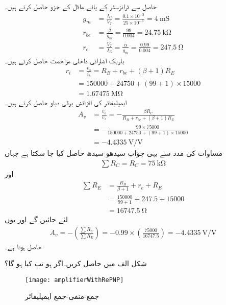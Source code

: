 حاصل   سے ٹرانزسٹر کے پائے ماڈل کے جزو حاصل کرتے ہیں۔
\begin{align*}
g_m&=\frac{I_C}{V_T}=\frac{0.1 \times 10^{-3}}{25 \times 10^{-3}}=\SI{4}{\milli \siemens}\\
r_{be}&=\frac{\beta}{g_m}=\frac{99}{0.004}=\SI{24.75}{\kilo \ohm}\\
r_e&=\frac{V_T}{I_E}=\frac{\alpha}{g_m}=\frac{0.99}{0.004}=\SI{247.5}{\ohm}
\end{align*}
باریک اشاراتی داخلی مزاحمت حاصل کرتے ہیں۔
\begin{align*}
r_i&=\frac{v_s}{i_b}=R_B+r_{be}+\left(\beta+1 \right )R_E\\
&=150000+24750+(99+1) \times 15000\\
&=\SI{1.67475}{\mega \ohm}
\end{align*}
ایمپلیفائر کی افزائش برقی دباو حاصل کرتے ہیں۔
\begin{align*}
A_v&=\frac{v_o}{v_s}=-\frac{\beta R_C}{R_B + r_{be}+(\beta+1)R_E}\\
&=-\frac{99 \times 75000}{150000+24750+(99+1) \times 15000}\\
&=\SI[per=frac,fraction=nice]{-4.4335}{\volt \per \volt}
\end{align*}
مساوات   کی مدد سے یہی جواب سیدھو سیدھ حاصل کیا جا سکتا ہے  جہاں
\begin{align*}
\sum{ R_C}=R_C=\SI{75}{\kilo \ohm}
\end{align*}
اور
\begin{align*}
\sum{R_E}&=\frac{R_B}{\beta+1}+r_e+R_E\\
&=\frac{150000}{99+1}+247.5+15000\\
&=\SI{16747.5}{\ohm}
\end{align*}
لئے جائیں گے اور یوں
\begin{align*}
A_v=-\left(\frac{\sum {R_C}}{\sum {R_E}} \right )=-0.99 \times \left(\frac{75000}{16747.5} \right )=\SI[per=frac,fraction=nice]{-4.4335}{\volt \per \volt}
\end{align*}
حاصل ہوتا ہے۔

شکل  الف میں  حاصل کریں۔اگر  ہو تب  کیا ہو گا؟
\begin{figure}
\centering
\texttt{[image: amplifierWithRePNP]}
\caption{جمع-منفی-جمع ایمپلیفائر}
\label{شکل_ٹرانزسٹر_جمع_منفی_جمع_امپلیفائر}
\end{figure}

